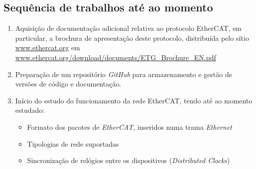 \subsection{Sequência de trabalhos até ao momento}\label{sec:seq_trabalhos}
\begin{enumerate}
    \item Aquisição de documentação adicional relativa ao protocolo EtherCAT, em particular, a brochura
    de apresentação deste protocolo, distribuída pelo sítio \url{www.ethercat.org} em \url{www.ethercat.org/download/documents/ETG_Brochure_EN.pdf}
    \item Preparação de um repositório \textit{GitHub} para armazenamento e gestão de versões de código e documentação.
    \item Início do estudo do funcionamento da rede EtherCAT, tendo até ao momento estudado:
        \begin{itemize}
            \item Formato dos pacotes de \textit{EtherCAT}, inseridos numa trama \textit{Ethernet}
            \item Tipologias de rede suportadas
            \item Sincronização de relógios entre os dispositivos (\textit{Distributed Clocks})
        \end{itemize}
\end{enumerate}
